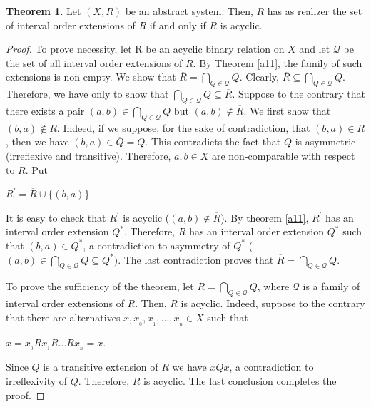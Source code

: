\documentclass{article}
\theoremstyle{definition}
\newtheorem{theorem}{Theorem}[section]
\begin{document}
\begin{theorem}\label{a12} {\rm Let $(X,R)$ be an abstract system. Then,
$\overline{R}$ has as realizer the set of interval order extensions of $R$ if and only if $R$ is acyclic. } 
\end{theorem}
\begin{proof}
To prove necessity, let R be an acyclic binary relation on $X$ and let $\mathcal{Q}$ be the set of all interval order extensions of $R$. 
By Theorem \ref{a11}, the family of such extensions is
non-empty.
We show that $\overline{R}=\displaystyle\bigcap_{Q\in \mathcal{Q}}Q$. Clearly, 
$\overline{R}\subseteq \displaystyle\bigcap_{Q\in \mathcal{Q}}Q$. 
Therefore, we have only to show that $\displaystyle\bigcap_{Q\in \mathcal{Q}}Q\subseteq \overline{R}$. 
Suppose to the contrary that there exists a pair $(a,b)\in \displaystyle\bigcap_{Q\in \mathcal{Q}}Q$ but $(a,b)\notin \overline{R}$. We first show that $(b,a)\notin \overline{R}$. Indeed, if we suppose, for the sake of contradiction, that $(b,a)\in \overline{R}$, then we have $(b,a)\in \overline{Q}=Q$.
This contradicts the fact that $Q$ is asymmetric (irreflexive and transitive).
Therefore, $a, b\in X$ are non-comparable with respect to $\overline{R}$. Put
\begin{center}
$R^{\prime}=\overline{R}\cup\{(b,a)\}$
\end{center}
It is easy to check that $R^{\prime}$ is acyclic ($(a,b)\notin \overline{R}$).
By theorem \ref{a11}, $R^{\prime}$ has an interval order extension
$Q^{\ast}$. Therefore, $R$ has an interval order extension
$Q^{\ast}$ such that $(b,a)\in Q^{\ast}$, a contradiction to
asymmetry of $Q^{\ast}$ ($(a,b)\in \displaystyle\bigcap_{Q\in \mathcal{Q}}Q\subseteq Q^{\ast}).$
The last contradiction proves that $\overline{R}=\displaystyle\bigcap_{Q\in \mathcal{Q}}Q$.

To prove 
the sufficiency of the theorem, let $\overline{R}=\displaystyle\bigcap_{Q\in \mathcal{Q}}Q$, where 
$\mathcal{Q}$ is a family of interval order extensions of $R$. Then, 
$R$ is acyclic. Indeed, suppose to the contrary that there are alternatives
$x, x_{_0}, x_{_1},..., x_{_n}\in X$ such that
\begin{center}
$x=x_{_0}Rx_{_1}R...Rx_{_n}=x$.
\end{center}
Since $Q$ is a transitive extension of $R$ we have $xQx$, a contradiction to irreflexivity of $Q$.
Therefore, $R$ is acyclic. The last conclusion completes the proof.
\end{proof}
\end{document}

